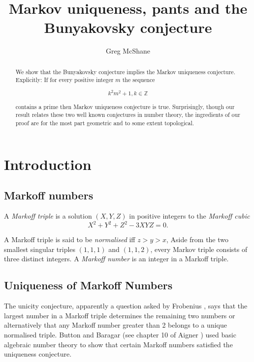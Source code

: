 \documentclass[12pt,a4paper]{amsart}
\title{Markov uniqueness, pants and the Bunyakovsky conjecture}
\author[McShane]{Greg McShane}
\def\ZZ{\mathbb{Z}}
\begin{document}
\maketitle

\begin{abstract} 

We show that the Bunyakovsky conjecture implies the Markov uniqueness
conjecture. Explicitly: If for every positive integer $m$ the sequence 

$$k^2m^2 + 1, k \in \ZZ$$ 

contains a prime then Markov uniqueness conjecture is true. Surprisingly,
though our result relates these two well known conjectures in number theory, 
the ingredients of   our proof are for the most part geometric and to some extent
topological.

\end{abstract} 


\section{Introduction}

\subsection{Markoff numbers}

A \textit{Markoff triple} is a  solution $(X,Y,Z)$  in positive integers to
the \textit{Markoff cubic}
\begin{equation}\label{m cubic}
X^2 + Y^2 + Z^2 - 3XYZ = 0.
\end{equation}

A Markoff triple is said to be \textit{normalised} iff $z> y > x$, Aside from
the two smallest singular triples $(1,1,1)$ and $(1,1,2)$, every Markov triple
consists of three distinct integers. A \textit{Markoff number} is an integer in
a Markoff triple.

\subsection{Uniqueness of Markoff Numbers}
 
The unicity conjecture, apparently a question asked by Frobenius \cite{frobenius}, says that the
largest number in a Markoff triple determines the remaining two numbers or
alternatively that any Markoff number greater than 2 belongs to a unique
normalised triple. Button and Baragar (see chapter 10 of Aigner \cite{aigner})
used  basic algebraic number theory to show that certain Markoff numbers
satisfied the uniqueness conjecture.  
\end{document}
